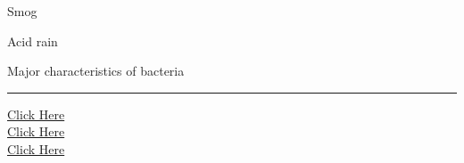\documentclass[11pt,a4paper]{article}
\begin{document}
\begin{parts}
  \item Smog
  \item Acid rain
  \item Major characteristics of bacteria
\end{parts}

\vfill
\rule{\linewidth}{0.4pt}

\begin{center}\small
\href{https://bhu-exam.vercel.app/}{Click Here}\\[4pt]\href{https://me-aryan.vercel.app/}{Click Here}\\[4pt]\href{https://quashan-me.vercel.app/}{Click Here}
\end{center}
\end{document}
